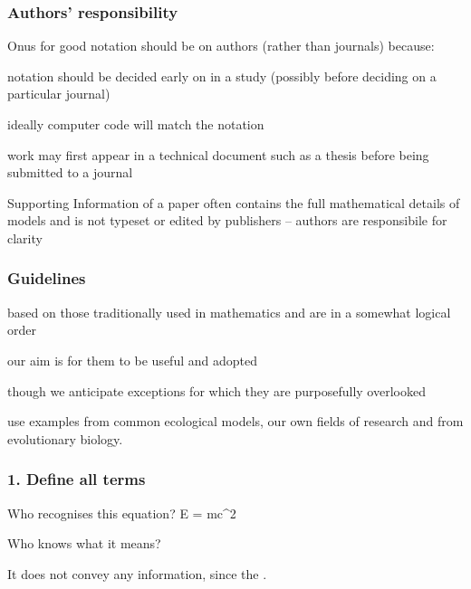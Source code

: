 \begin{frame}
\frametitle{Authors' responsibility}
Onus for good notation should be on authors (rather than journals)
because:
\bi
  \item notation should be decided early on in a study (possibly before deciding on a
    particular journal)
  \item ideally computer code will match the notation
  \item  work may first appear in a technical document such as a thesis before being
      submitted to a journal
  \item Supporting Information of a paper often contains the full mathematical details of
models and is not typeset or edited by publishers -- authors are responsibile for
clarity
\ei
\end{frame}


\begin{frame}
\frametitle{Guidelines}
\bi
  \item based on those traditionally used in mathematics and are in a somewhat
    logical order
  \item our aim is for them to be useful and adopted
  \item though we anticipate exceptions for which they are purposefully
    overlooked
  \item use examples from common ecological models, our own fields of research and from evolutionary biology.
\ei
\end{frame}


\begin{frame}
\frametitle{1. Define all terms}

Who recognises this equation?
\eb
\nonumber E = mc^2
\ee

\pause Who knows what it means?

\medskip

\pause It does not convey any information, since the .

\end{frame}


